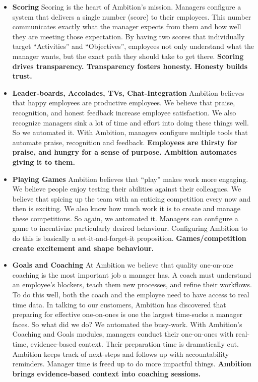\documentclass[paper=a4, fontsize=11pt abstract]{scrartcl}
\numberwithin{equation}{section}		%
\numberwithin{figure}{section}			%
\numberwithin{table}{section}				%
\begin{document}
\begin{itemize}
    \item \textbf{Scoring}
    Scoring is the heart of Ambition's mission.
    Managers configure a system that delivers a single number (score) to their employees.
    This number communicates exactly what the manager expects from them and how well they are meeting those expectation.
    By having two scores that individually target ``Activities'' and ``Objectives'', employees not only understand what the manager wants, but the exact path they should take to get there.
    \textbf{Scoring drives transparency. Transparency fosters honesty.  Honesty builds trust.}
    
    \item \textbf{Leader-boards, Accolades, TVs, Chat-Integration}
    Ambition believes that happy employees are productive employees.
    We believe that praise, recognition, and honest feedback increase employee satisfaction.
    We also recognize managers sink a lot of time and effort into doing these things well.
    So we automated it.
    With Ambition, managers configure multiple tools that automate praise, recognition and feedback.
    \textbf{Employees are thirsty for praise, and hungry for a sense of purpose.
    Ambition automates giving it to them.}
    
    \item \textbf{Playing Games}
    Ambition believes that ``play'' makes work more engaging.
    We believe people enjoy testing their abilities against their colleagues.
    We believe that spicing up the team with an enticing competition every now and then is exciting.
    We also know how much work it is to create and manage these competitions.
    So again, we automated it.
    Managers can configure a game to incentivize particularly desired behaviour.
    Configuring Ambition to do this is basically a set-it-and-forget-it proposition.
    \textbf{Games/competition create excitement and shape behaviour.}
    
    \item \textbf{Goals and Coaching}
    At Ambition we believe that quality one-on-one coaching is the most important job a manager has.
    A coach must understand an employee's blockers, teach them new processes, and refine their workflows.
    To do this well, both the coach and the employee need to have access to real time data.
    In talking to our customers, Ambition has discovered that preparing for effective one-on-ones is one the largest time-sucks a manager faces.
    So what did we do?
    We automated the busy-work.
    With Ambition's Coaching and Goals modules, managers conduct their one-on-ones with real-time, evidence-based context.
    Their preparation time is dramatically cut.
    Ambition keeps track of next-steps and follows up with accountability reminders.
    Manager time is freed up to do more impactful things.
    \textbf{Ambition brings evidence-based context into coaching sessions.}
   

\end{itemize}
\end{document}
